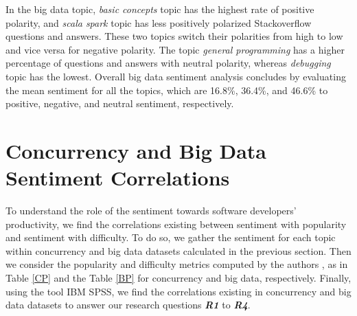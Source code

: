 In the big data topic, \emph{basic concepts} topic has the highest rate of positive polarity, and \emph{scala spark} topic has less positively polarized Stackoverflow questions and answers. These two topics switch their polarities from high to low and vice versa for negative polarity. The topic \emph{general programming} has a higher percentage of questions and answers with neutral polarity, whereas \emph{debugging} topic has the lowest. Overall big data sentiment analysis concludes by evaluating the mean sentiment for all the topics, which are 16.8\%, 36.4\%, and 46.6\% to positive, negative, and neutral sentiment, respectively. 

\section{Concurrency and Big Data Sentiment Correlations}

To understand the role of the sentiment towards software developers' productivity, we find the correlations existing between sentiment with popularity and sentiment with difficulty. To do so, we gather the sentiment for each topic within concurrency and big data datasets calculated in the previous section. Then we consider the popularity and difficulty metrics computed by the authors \cite{ahmed2018concurrency, bagherzadeh2019going}, as in Table \ref{CP} and the Table \ref{BP} for concurrency and big data, respectively. Finally, using the tool IBM SPSS, we find the correlations existing in concurrency and big data datasets to answer our research questions \emph{\textbf{R1}} to \emph{\textbf{R4}}.


